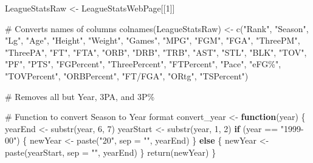 \documentclass[
  letterpaper,
  DIV=11,
  numbers=noendperiod]{scrartcl}
\newenvironment{Shaded}{\begin{snugshade}}{\end{snugshade}}
\newcommand{\AttributeTok}[1]{\textcolor[rgb]{0.40,0.45,0.13}{#1}}
\newcommand{\CommentTok}[1]{\textcolor[rgb]{0.37,0.37,0.37}{#1}}
\newcommand{\ControlFlowTok}[1]{\textcolor[rgb]{0.00,0.23,0.31}{\textbf{#1}}}
\newcommand{\DecValTok}[1]{\textcolor[rgb]{0.68,0.00,0.00}{#1}}
\newcommand{\FunctionTok}[1]{\textcolor[rgb]{0.28,0.35,0.67}{#1}}
\newcommand{\NormalTok}[1]{\textcolor[rgb]{0.00,0.23,0.31}{#1}}
\newcommand{\OtherTok}[1]{\textcolor[rgb]{0.00,0.23,0.31}{#1}}
\newcommand{\SpecialCharTok}[1]{\textcolor[rgb]{0.37,0.37,0.37}{#1}}
\newcommand{\StringTok}[1]{\textcolor[rgb]{0.13,0.47,0.30}{#1}}
\begin{document}
\begin{Shaded}
\begin{Highlighting}[]
\NormalTok{LeagueStatsRaw }\OtherTok{\textless{}{-}}\NormalTok{ LeagueStatsWebPage[[}\DecValTok{1}\NormalTok{]]}

\CommentTok{\# Converts names of columns}
\FunctionTok{colnames}\NormalTok{(LeagueStatsRaw) }\OtherTok{\textless{}{-}} \FunctionTok{c}\NormalTok{(}\StringTok{"Rank"}\NormalTok{, }\StringTok{"Season"}\NormalTok{, }\StringTok{"Lg"}\NormalTok{, }\StringTok{"Age"}\NormalTok{, }\StringTok{"Height"}\NormalTok{, }\StringTok{"Weight"}\NormalTok{, }\StringTok{"Games"}\NormalTok{, }\StringTok{"MPG"}\NormalTok{, }\StringTok{"FGM"}\NormalTok{, }\StringTok{"FGA"}\NormalTok{, }\StringTok{"ThreePM"}\NormalTok{, }\StringTok{"ThreePA"}\NormalTok{, }\StringTok{"FT"}\NormalTok{, }\StringTok{"FTA"}\NormalTok{, }\StringTok{"ORB"}\NormalTok{, }\StringTok{"DRB"}\NormalTok{, }\StringTok{"TRB"}\NormalTok{, }\StringTok{"AST"}\NormalTok{, }\StringTok{"STL"}\NormalTok{, }\StringTok{"BLK"}\NormalTok{, }\StringTok{"TOV"}\NormalTok{, }\StringTok{"PF"}\NormalTok{, }\StringTok{"PTS"}\NormalTok{, }\StringTok{"FGPercent"}\NormalTok{, }\StringTok{"ThreePercent"}\NormalTok{, }\StringTok{"FTPercent"}\NormalTok{, }\StringTok{"Pace"}\NormalTok{, }\StringTok{"eFG\%"}\NormalTok{, }\StringTok{"TOVPercent"}\NormalTok{, }\StringTok{"ORBPercent"}\NormalTok{, }\StringTok{"FT/FGA"}\NormalTok{, }\StringTok{"ORtg"}\NormalTok{, }\StringTok{"TSPercent"}\NormalTok{)}

\CommentTok{\# Removes all but Year, 3PA, and 3P\%}

\CommentTok{\# Function to convert Season to Year format}
\NormalTok{convert\_year }\OtherTok{\textless{}{-}} \ControlFlowTok{function}\NormalTok{(year) \{}
\NormalTok{  yearEnd }\OtherTok{\textless{}{-}} \FunctionTok{substr}\NormalTok{(year, }\DecValTok{6}\NormalTok{, }\DecValTok{7}\NormalTok{)}
\NormalTok{  yearStart }\OtherTok{\textless{}{-}} \FunctionTok{substr}\NormalTok{(year, }\DecValTok{1}\NormalTok{, }\DecValTok{2}\NormalTok{)}
  \ControlFlowTok{if}\NormalTok{ (year }\SpecialCharTok{==} \StringTok{"1999{-}00"}\NormalTok{) \{}
\NormalTok{    newYear }\OtherTok{\textless{}{-}} \FunctionTok{paste}\NormalTok{(}\StringTok{"20"}\NormalTok{, }\AttributeTok{sep =} \StringTok{""}\NormalTok{, yearEnd)}
\NormalTok{  \} }\ControlFlowTok{else}\NormalTok{ \{}
\NormalTok{    newYear }\OtherTok{\textless{}{-}} \FunctionTok{paste}\NormalTok{(yearStart, }\AttributeTok{sep =} \StringTok{""}\NormalTok{, yearEnd)}
\NormalTok{  \}}
  \FunctionTok{return}\NormalTok{(newYear)}
\NormalTok{\}}


\end{Highlighting}
\end{Shaded}
\end{document}
